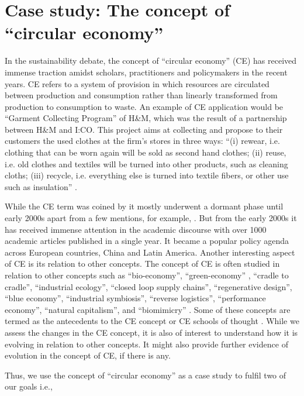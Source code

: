\documentclass[output=paper]{langsci/langscibook}
\begin{document}
\section{Case study: The concept of ``circular economy''}\label{ch03:casestudy}
In the sustainability debate, the concept of ``circular economy'' (CE) has received immense traction amidst scholars, practitioners and policymakers in the recent years. CE refers to a system of provision in which resources are circulated between production and consumption rather than linearly transformed from production to consumption to waste. An example of CE application would be ``Garment Collecting Program'' of H\&M, which was the result of a partnership between H\&M and I:CO. This project aims at collecting and propose to their customers the used clothes at the firm's stores in three ways: ``(i) rewear, i.e. clothing that can be worn again will be sold as second hand clothes; (ii) reuse, i.e. old clothes and textiles will be turned into other products, such as cleaning cloths; (iii) recycle, i.e. everything else is turned into textile fibers, or other use such as insulation'' \citep{urbinati2017towards}.

While the CE term was coined by \citet{pearce1990economics} it mostly underwent a dormant phase until early 2000s apart from a few mentions, for example, \citet{cooper1994beyond, cooper1999creating}. But from the early 2000s it has received immense attention in the academic discourse with over 1000 academic articles published in a single year. It became a popular policy agenda across European countries, China and Latin America. Another interesting aspect of CE is its relation to other concepts. The concept of CE is often studied in relation to other concepts such as ``bio-economy'', ``green-economy'' \citep{d2017green}, ``cradle to cradle'', ``industrial ecology'', ``closed loop supply chains'', ``regenerative design'', ``blue economy'', ``industrial symbiosis'', ``reverse logistics'', ``performance economy'', ``natural capitalism'', and ``biomimicry'' \citep{geisendorf2018circular}. Some of these concepts are termed as the antecedents to the CE concept or CE schools of thought \citep{homrich2018circular}. While we assess the changes in the CE concept, it is also of interest to understand how it is evolving in relation to other concepts. It might also provide further evidence of evolution in the concept of CE, if there is any.

Thus, we use the concept of ``circular economy'' as a case study to fulfil two of our goals i.e.,
\end{document}

